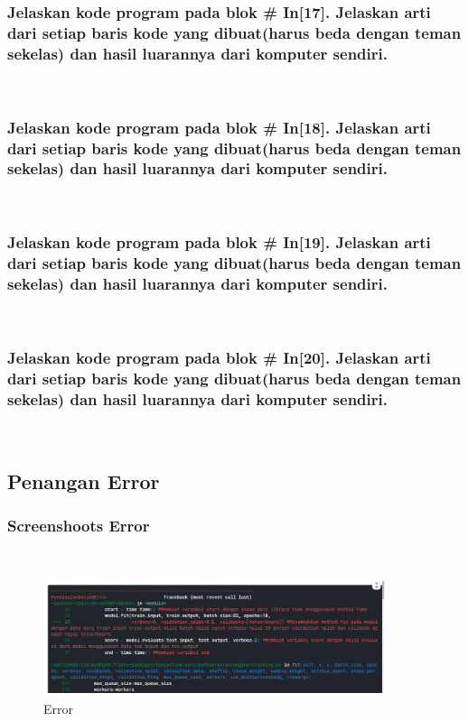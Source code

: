 	\subsubsection{Jelaskan kode program pada blok \# In[17]. Jelaskan arti dari setiap baris kode yang dibuat(harus beda dengan teman sekelas) dan hasil luarannya dari komputer sendiri.}
	\hfill\\
	
	\subsubsection{Jelaskan kode program pada blok \# In[18]. Jelaskan arti dari setiap baris kode yang dibuat(harus beda dengan teman sekelas) dan hasil luarannya dari komputer sendiri.}
	\hfill\\
	
	\subsubsection{Jelaskan kode program pada blok \# In[19]. Jelaskan arti dari setiap baris kode yang dibuat(harus beda dengan teman sekelas) dan hasil luarannya dari komputer sendiri.}
	\hfill\\
	
	\subsubsection{Jelaskan kode program pada blok \# In[20]. Jelaskan arti dari setiap baris kode yang dibuat(harus beda dengan teman sekelas) dan hasil luarannya dari komputer sendiri.}
	\hfill\\
	
	 
\subsection{Penangan Error}
	
	\subsubsection{Screenshoots Error}\hfill\\
	
	\begin{figure}[H]
		\begin{center}
		 \includegraphics[width=10cm]{figures/1174076/figures7/error1.png}
		 \caption{Error}	
		\end{center}
	\end{figure}
	
